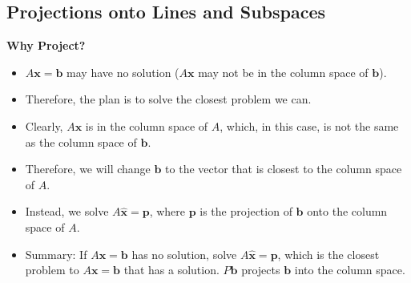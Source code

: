 \documentclass[11pt]{article}
\begin{document}
\subsection{Projections onto Lines and Subspaces}

\textbf{Why Project?}
\begin{itemize}
    \item $A\boldsymbol{x}=\boldsymbol{b}$ may have no solution ($A \boldsymbol{x}$ may not be 
    in the column space of $\boldsymbol{b}$).
    \item Therefore, the plan is to solve the closest problem we can.
    \item Clearly, $A\boldsymbol{x}$ is in the column space of $A$, which, in this case, is not
    the same as the column space of $\boldsymbol{b}$.
    \item Therefore, we will change $\boldsymbol{b}$ to the vector that is closest to the 
    column space of $A$.
    \item Instead, we solve $A\boldsymbol{\hat{x}}=\boldsymbol{p}$, where $\boldsymbol{p}$ is 
    the projection of $\boldsymbol{b}$ onto the column space of $A$.
    \item Summary: If $A\boldsymbol{x}=\boldsymbol{b}$ has no solution, solve $A\boldsymbol{
    \hat{x}}=\boldsymbol{p}$, which is the closest problem to $A\boldsymbol{x}=\boldsymbol{b}$ 
    that has a solution. $P\boldsymbol{b}$ projects $\boldsymbol{b}$ into the column space.

\end{itemize} 
\end{document}
